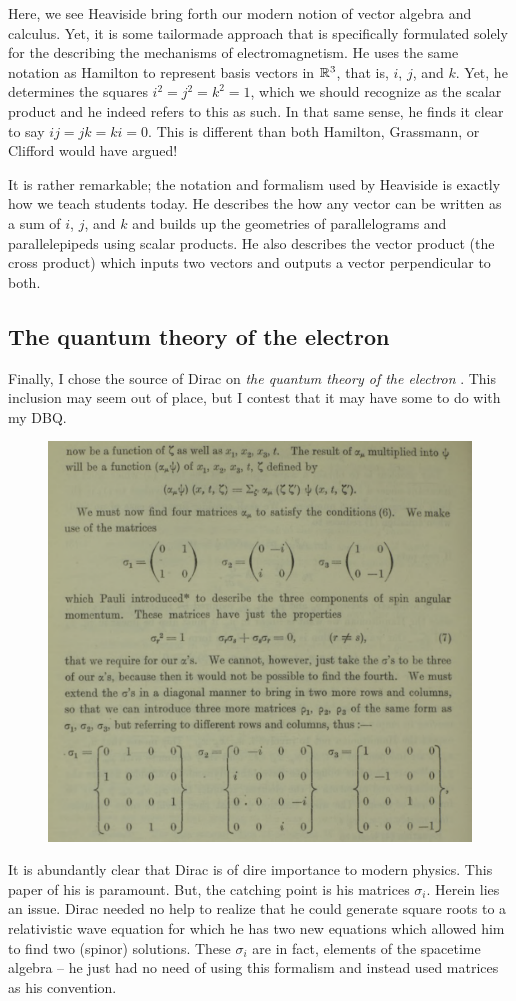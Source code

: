 \documentclass[12pt]{article}
\begin{document}
Here, we see Heaviside bring forth our modern notion of vector algebra and calculus. Yet, it is some tailormade approach that is specifically formulated solely for the describing the mechanisms of electromagnetism. He uses the same notation as Hamilton to represent basis vectors in $\mathbb{R}^3$, that is, $i$, $j$, and $k$. Yet, he determines the squares $i^2=j^2=k^2=1$, which we should recognize as the scalar product and he indeed refers to this as such. In that same sense, he finds it clear to say $ij=jk=ki=0$. This is different than both Hamilton, Grassmann, or Clifford would have argued!

It is rather remarkable; the notation and formalism used by Heaviside is exactly how we teach students today. He describes the how any vector can be written as a sum of $i$, $j$, and $k$ and builds up the geometries of parallelograms and parallelepipeds using scalar products. He also describes the vector product (the cross product) which inputs two vectors and outputs a vector perpendicular to both. 

\newpage
\subsection{The quantum theory of the electron}

Finally, I chose the source of Dirac on \emph{the quantum theory of the electron} \cite{dirac_quantum_1928}. This inclusion may seem out of place, but I contest that it may have some to do with my DBQ.

\begin{figure}[H]
    \centering
    \includegraphics[width=.6\textwidth]{figures/dirac_matrices.png}
\end{figure}

It is abundantly clear that Dirac is of dire importance to modern physics. This paper of his is paramount. But, the catching point is his matrices $\sigma_i$. Herein lies an issue. Dirac needed no help to realize that he could generate square roots to a relativistic wave equation for which he has two new equations which allowed him to find two (spinor) solutions. These $\sigma_i$ are in fact, elements of the spacetime algebra -- he just had no need of using this formalism and instead used matrices as his convention. 
\end{document}
